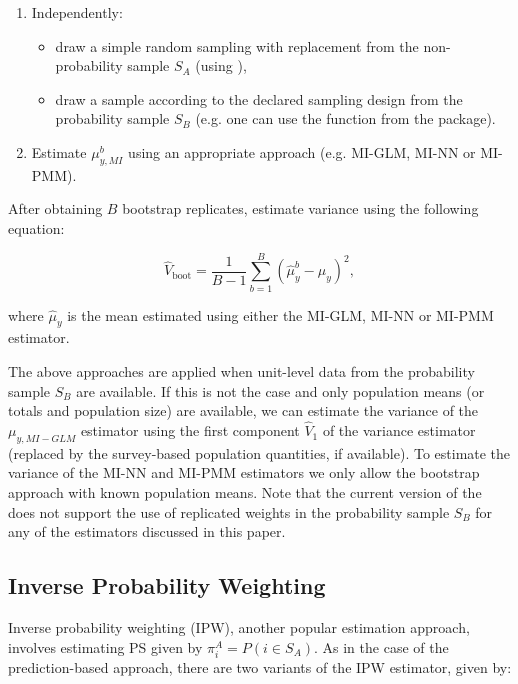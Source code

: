 \documentclass[
]{jss}
\begin{document}
\begin{enumerate}
\item Independently:
  \begin{itemize}
  \item draw a simple random sampling with replacement from the non-probability sample $S_A$ (using ),
  \item draw a sample according to the declared sampling design from the probability sample $S_B$ (e.g. one can use the  function from the  package).
  \end{itemize}
\item Estimate $\mu_{y, MI}^b$ using an appropriate approach (e.g. MI-GLM, MI-NN or MI-PMM).
\end{enumerate}

After obtaining \(B\) bootstrap replicates, estimate variance using the
following equation:

\begin{equation}
\hat{V}_{\text{boot}} = \frac{1}{B-1}\sum_{b=1}^B\left(\hat{\mu}^b_y - \hat{\mu}_y\right)^2,
\label{eq-var-bootstrap}
\end{equation}

where \(\hat{\mu}_y\) is the mean estimated using either the MI-GLM,
MI-NN or MI-PMM estimator.

The above approaches are applied when unit-level data from the
probability sample \(S_B\) are available. If this is not the case and
only population means (or totals and population size) are available, we
can estimate the variance of the \(\mu_{y,MI-GLM}\) estimator using the
first component \(\hat{V}_1\) of the \citet{kim_combining_2021} variance
estimator (replaced by the survey-based population quantities, if
available). To estimate the variance of the MI-NN and MI-PMM estimators
we only allow the bootstrap approach with known population means. Note
that the current version of the  does not support the
use of replicated weights in the probability sample \(S_B\) for any of
the estimators discussed in this paper.

\subsection{Inverse Probability Weighting}\label{sec-ipw}

Inverse probability weighting (IPW), another popular estimation
approach, involves estimating PS given by
\(\pi_i^A=P\left(i \in S_A \right)\). As in the case of the
prediction-based approach, there are two variants of the IPW estimator,
given by:
\end{document}
